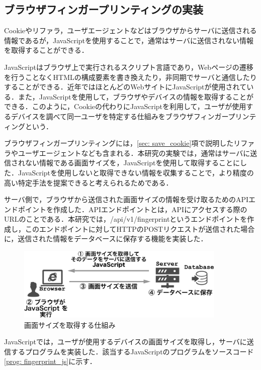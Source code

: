 \documentclass[10pt, a4paper]{jreport}
\begin{document}
\subsection{ブラウザフィンガープリンティングの実装}
Cookieやリファラ，ユーザエージェントなどはブラウザからサーバに送信される情報であるが，JavaScriptを使用することで，通常はサーバに送信されない情報を取得することができる．

JavaScriptはブラウザ上で実行されるスクリプト言語であり，Webページの遷移を行うことなくHTMLの構成要素を書き換えたり，非同期でサーバと通信したりすることができる．近年ではほとんどのWebサイトにJavaScriptが使用されている．また，JavaScriptを使用して，ブラウザやデバイスの情報を取得することができる．このように，Cookieの代わりにJavaScriptを利用して，ユーザが使用するデバイスを調べて同一ユーザを特定する仕組みをブラウザフィンガープリンティングという．

ブラウザフィンガープリンティングには，\ref{sec: save_cookie}項で説明したリファラやユーザエージェントなども含まれる．本研究の実験では，通常はサーバに送信されない情報である画面サイズを，JavaScriptを使用して取得することにした．JavaScriptを使用しないと取得できない情報を収集することで，より精度の高い特定手法を提案できると考えられるためである．

サーバ側で，ブラウザから送信された画面サイズの情報を受け取るためのAPIエンドポイントを作成した．APIエンドポイントとは，APIにアクセスする際のURLのことである．本研究では，/api/v1/fingerprintというエンドポイントを作成し，このエンドポイントに対してHTTPのPOSTリクエストが送信された場合に，送信された情報をデータベースに保存する機能を実装した．

\begin{figure}[H]
	\begin{center}
		\includegraphics[width=100mm]{figures/fingerprint.pdf}
	\end{center}
	\caption{画面サイズを取得する仕組み}
	\label{fig: fingerprint}
\end{figure}

JavaScriptでは，ユーザが使用するデバイスの画面サイズを取得し，サーバに送信するプログラムを実装した．該当するJavaScriptのプログラムをソースコード\ref{prog: fingerprint_js}に示す．
\end{document}
